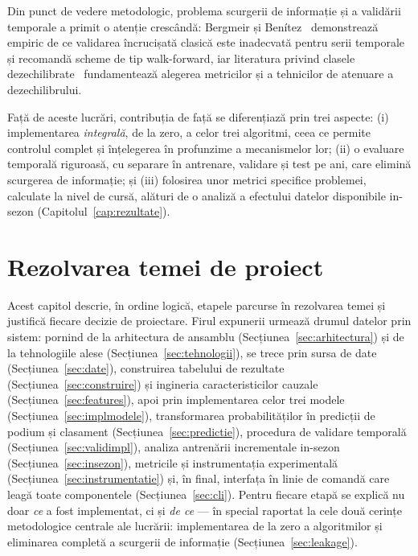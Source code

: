 \documentclass[12pt,a4paper]{report}
\begin{document}
Din punct de vedere metodologic, problema scurgerii de informație și a validării temporale a
primit o atenție crescândă: Bergmeir și Benítez~\cite{bergmeir2012use} demonstrează empiric de ce
validarea încrucișată clasică este inadecvată pentru serii temporale și recomandă scheme de tip
walk-forward, iar literatura privind clasele dezechilibrate~\cite{he2009learning, chawla2002smote,
saito2015precision} fundamentează alegerea metricilor și a tehnicilor de atenuare a
dezechilibrului.

Față de aceste lucrări, contribuția de față se diferențiază prin trei aspecte: (i) implementarea
\emph{integrală}, de la zero, a celor trei algoritmi, ceea ce permite controlul complet și
înțelegerea în profunzime a mecanismelor lor; (ii) o evaluare temporală riguroasă, cu separare în
antrenare, validare și test pe ani, care elimină scurgerea de informație; și (iii) folosirea unor
metrici specifice problemei, calculate la nivel de cursă, alături de o analiză a efectului
datelor disponibile in-sezon (Capitolul~\ref{cap:rezultate}).

\chapter{Rezolvarea temei de proiect}
\label{cap:rezolvare}

Acest capitol descrie, în ordine logică, etapele parcurse în rezolvarea temei și justifică
fiecare decizie de proiectare. Firul expunerii urmează drumul datelor prin sistem: pornind de la
arhitectura de ansamblu (Secțiunea~\ref{sec:arhitectura}) și de la tehnologiile alese
(Secțiunea~\ref{sec:tehnologii}), se trece prin sursa de date (Secțiunea~\ref{sec:date}),
construirea tabelului de rezultate (Secțiunea~\ref{sec:construire}) și ingineria caracteristicilor
cauzale (Secțiunea~\ref{sec:features}), apoi prin implementarea celor trei modele
(Secțiunea~\ref{sec:implmodele}), transformarea probabilităților în predicții de podium și
clasament (Secțiunea~\ref{sec:predictie}), procedura de validare temporală
(Secțiunea~\ref{sec:validimpl}), analiza antrenării incrementale in-sezon
(Secțiunea~\ref{sec:insezon}), metricile și instrumentația experimentală
(Secțiunea~\ref{sec:instrumentatie}) și, în final, interfața în linie de comandă care leagă toate
componentele (Secțiunea~\ref{sec:cli}). Pentru fiecare etapă se explică nu doar \emph{ce} a fost
implementat, ci și \emph{de ce} --- în special raportat la cele două cerințe metodologice centrale
ale lucrării: implementarea de la zero a algoritmilor și eliminarea completă a scurgerii de
informație (Secțiunea~\ref{sec:leakage}).
\end{document}
